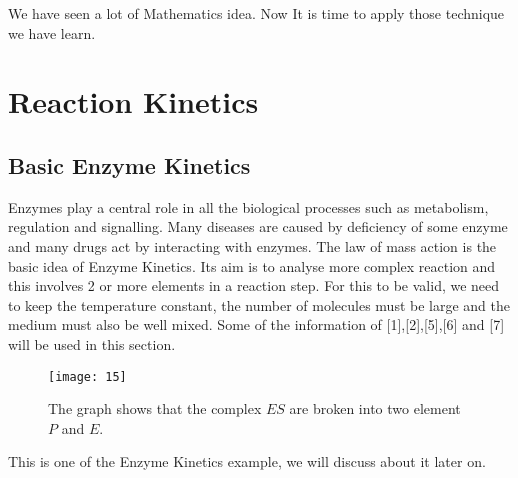 \documentclass[a4paper]{report}
\theoremstyle{definition}
\begin{document}
We have seen a lot of Mathematics idea. Now It is time to apply those technique we have learn.
\chapter{Reaction Kinetics}
\section{Basic Enzyme Kinetics}

Enzymes play a central role in all the biological processes such as metabolism,
regulation and signalling. Many diseases are caused by deficiency of some enzyme
and many drugs act by interacting with enzymes. The law of mass action is the basic idea of Enzyme Kinetics. Its aim is to analyse more complex reaction and this involves 2 or more elements in a reaction step. For this to be valid, we need to keep the temperature constant, the number of molecules must be large and the medium must also be well mixed. Some of the information of [1],[2],[5],[6] and [7] will be used in this section.
\begin{figure}[H]
\centering
\texttt{[image: 15]}
\caption{The graph shows that the complex $ES$ are broken into two element $P$ and $E$.}
\label{fig:figure3}
\end{figure}
This is one of the Enzyme Kinetics example, we will discuss about it later on. 
\end{document}
